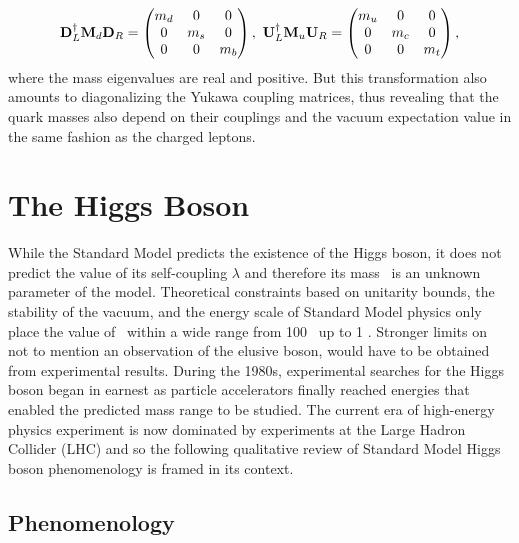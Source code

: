 \begin{equation}
  \mathbf{D}_{L}^{\dag}\mathbf{M}_{\qrkd}\mathbf{D}_{R} = \begin{pmatrix} m_{\qrkd} & 0 & 0 \\ 0 & m_{\qrks} & 0 \\ 0 & 0 & m_{\qrkb} \\ \end{pmatrix},\ \mathbf{U}_{L}^{\dag}\mathbf{M}_{\qrku}\mathbf{U}_{R} = \begin{pmatrix} m_{\qrku} & 0 & 0 \\ 0 & m_{\qrkc} & 0 \\ 0 & 0 & m_{\qrkt} \\ \end{pmatrix},
\end{equation}
where the mass eigenvalues are real and positive. But this transformation also amounts to diagonalizing the Yukawa coupling matrices, thus revealing that the quark masses also depend on their couplings and the vacuum expectation value in the same fashion as the charged leptons.

\section{The Higgs Boson}

While the Standard Model predicts the existence of the Higgs boson, it does not predict the value of its self-coupling $\lambda$ and therefore its mass \massH\ is an unknown parameter of the model. Theoretical constraints based on unitarity bounds, the stability of the vacuum, and the energy scale of Standard Model physics only place the value of \massH\ within a wide range from 100 \GeV\ up to 1 \TeV. Stronger limits on \massH\, not to mention an observation of the elusive boson, would have to be obtained from experimental results. During the 1980s, experimental searches for the Higgs boson began in earnest as particle accelerators finally reached energies that enabled the predicted mass range to be studied. The current era of high-energy physics experiment is now dominated by experiments at the Large Hadron Collider (LHC) and so the following qualitative review of Standard Model Higgs boson phenomenology is framed in its context.

\subsection{Phenomenology}

